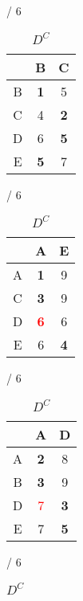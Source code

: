 \documentclass[a4paper, 11 pt, article, accentcolor=tud7b]{tudreport}
\begin{document}
	\begin{table}[h]
	  \begin{subtable}[b]{\textwidth / 6}
	    \begin{tabular}{| c | c | c |}
	      \hline
	        & B                   & C          \\ \hline
	      B & \textbf{1}          & 5          \\ \hline
	      C & 4                   & \textbf{2} \\ \hline
	      D & 6                   & \textbf{5} \\ \hline
	      E & \textbf{5}          & 7          \\ \hline
	    \end{tabular}
	    \caption{$D^{A}$}
	  \end{subtable}
	  \hfill
	  \begin{subtable}[b]{\textwidth / 6}
	    \begin{tabular}{| c | c | c |}
	    \hline
	      & A                   & E                  \\ \hline
	    A & \textbf{1}          & 9                  \\ \hline
	    C & \textbf{3}          & 9                  \\ \hline
	    D & \textbf{\textcolor{red}{6}} & 6          \\ \hline
	    E & 6                   & \textbf{4}         \\ \hline
	    \end{tabular}
	    \caption{$D^{B}$}
	  \end{subtable}
	  \hfill
	  \begin{subtable}[b]{\textwidth / 6}
	    \begin{tabular}{| c | c | c |}
	    \hline
	      & A                   & D                  \\ \hline
	    A & \textbf{2}          & 8                  \\ \hline
	    B & \textbf{3}          & 9                  \\ \hline
	    D & \textcolor{red}{7}  & \textbf{3}         \\ \hline
	    E & 7                   & \textbf{5}         \\ \hline
	    \end{tabular}
	    \caption{$D^{C}$}
	  \end{subtable}
    \hfill
	  \begin{subtable}[b]{\textwidth / 6}
	    \begin{tabular}{| c | c | c |}

\end{tabular}
\end{subtable}
\end{table}
\end{document}
